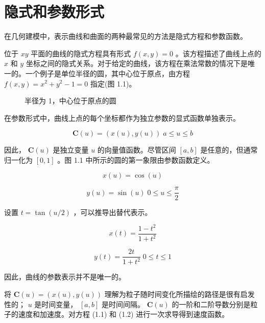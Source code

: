 \documentclass[../main.tex]{subfiles}
\begin{document}
\section{隐式和参数形式}

在几何建模中，表示曲线和曲面的两种最常见的方法是隐式方程和参数函数。

位于 \({xy}\) 平面的曲线的隐式方程具有形式 \(f\left( {x,y}\right)  = 0\) 。该方程描述了曲线上点的 \(x\) 和 \(y\) 坐标之间的隐式关系。对于给定的曲线，该方程在乘法常数的情况下是唯一的。一个例子是单位半径的圆，其中心位于原点，由方程 \(f\left( {x,y}\right)  = {x}^{2} + {y}^{2} - 1 = 0\) 指定(图 1.1)。


\begin{figure}[ht]
    \centering
    \caption{半径为 1，中心位于原点的圆}\label{fig:unit_circle}
\end{figure}

在参数形式中，曲线上点的每个坐标都作为独立参数的显式函数单独表示。

\[
\mathbf{C}\left( u\right)  = \left( {x\left( u\right) ,y\left( u\right) }\right) \;a \leq  u \leq  b
\]

因此， \(\mathbf{C}\left( u\right)\) 是独立变量 \(u\) 的向量值函数。尽管区间 \(\left\lbrack  {a,b}\right\rbrack\) 是任意的，但通常归一化为 \(\left\lbrack  {0,1}\right\rbrack\) 。图 1.1 中所示的圆的第一象限由参数函数定义。

\[
x\left( u\right)  = \cos \left( u\right)
\]

\[
y\left( u\right)  = \sin \left( u\right) \;0 \leq  u \leq  \frac{\pi }{2} \tag{1.1}
\]

设置 \(t = \tan \left( {u/2}\right)\) ，可以推导出替代表示。

\[
x\left( t\right)  = \frac{1 - {t}^{2}}{1 + {t}^{2}}
\]

\[
y\left( t\right)  = \frac{2t}{1 + {t}^{2}}\;0 \leq  t \leq  1 \tag{1.2}
\]

因此，曲线的参数表示并不是唯一的。


将 \(\mathbf{C}\left( u\right)  = \left( {x\left( u\right) ,y\left( u\right) }\right)\) 理解为粒子随时间变化所描绘的路径是很有启发性的； \(u\) 是时间变量， \(\left\lbrack  {a,b}\right\rbrack\) 是时间间隔。 \(\mathbf{C}\left( u\right)\) 的一阶和二阶导数分别是粒子的速度和加速度。对方程 (1.1) 和 (1.2) 进行一次求导得到速度函数。
\end{document}
